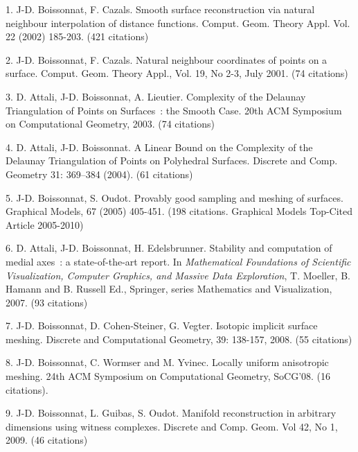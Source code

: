
1. J-D. Boissonnat, F. Cazals. Smooth surface reconstruction via natural neighbour interpolation of
distance functions.  Comput. Geom. Theory Appl. Vol. 22 (2002) 185-203.  (421 citations)

2.  J-D. Boissonnat, F. Cazals. Natural neighbour coordinates of points on a surface.  
Comput. Geom. Theory Appl., Vol. 19, No 2-3, July 2001. (74 citations)

3. D. Attali, J-D. Boissonnat, A. Lieutier. Complexity of the Delaunay Triangulation of Points on Surfaces~: the 
Smooth Case. 20th  ACM      Symposium on Computational Geometry, 2003. 
(74 citations)

4. D. Attali, J-D. Boissonnat. A Linear Bound on the Complexity of the Delaunay Triangulation of Points on Polyhedral Surfaces.  Discrete and Comp. Geometry 31: 369--384
(2004). (61 citations)

5. J-D. Boissonnat, S. Oudot. Provably good sampling and meshing of surfaces. Graphical Models, 67 (2005) 405-451. (198 citations. Graphical Models Top-Cited Article 2005-2010)

6. D. Attali, J-D. Boissonnat, H. Edelsbrunner. Stability and computation of medial axes~: a state-of-the-art report.
In {\em Mathematical Foundations of Scientific Visualization,
Computer Graphics, and Massive Data Exploration},
T. Moeller,   B. Hamann and B. Russell Ed.,
Springer, series Mathematics and Visualization, 2007. (93 citations)

7. J-D. Boissonnat, D. Cohen-Steiner, G. Vegter. Isotopic implicit surface meshing.  Discrete and Computational Geometry,  39: 138-157,  2008. (55 citations)%

8. J-D. Boissonnat, C. Wormser and M. Yvinec. Locally uniform anisotropic meshing. 
24th ACM Symposium on Computational Geometry, SoCG'08.
(16 citations). 

9. J-D. Boissonnat, L. Guibas, S. Oudot. Manifold reconstruction in arbitrary dimensions using witness complexes.
Discrete and Comp. Geom. Vol 42, No 1, 2009. (46 citations)


